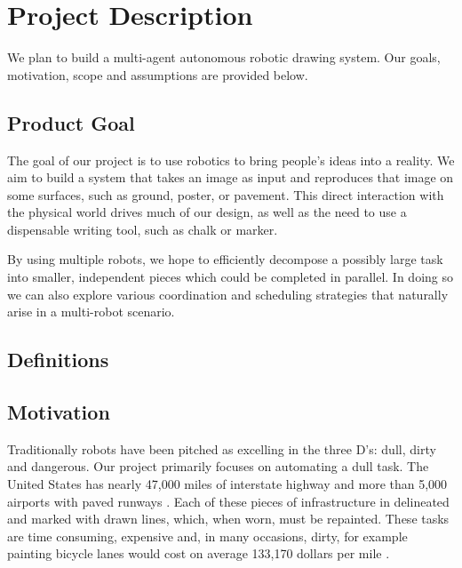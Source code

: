 
\section{Project Description}
\label{sec:project_description}
We plan to build a multi-agent autonomous robotic drawing system. Our goals, motivation,  scope and assumptions are provided below.

\subsection{Product Goal}
\label{sec:project_goal}
The goal of our project is to use robotics to bring people's ideas  into a reality. 
We aim to build a system that takes an image as input and reproduces that image on some surfaces, such as ground, poster, or pavement.
This direct interaction with the physical world drives much of our design, as well as the need to use a dispensable writing tool, such as chalk or marker. 

By using multiple robots, we hope to efficiently decompose a possibly large task into smaller, independent pieces which could be completed in parallel.
In doing so we can also explore various coordination and scheduling strategies that naturally arise in a multi-robot scenario. 

\subsection{Definitions}
\label{sec:definitions}


\subsection{Motivation}
\label{sec:motivation}

Traditionally robots have been pitched as excelling in the three D's: dull, dirty and dangerous. Our project primarily focuses on automating a dull task. The United States has nearly 47,000 miles of interstate highway and more than 5,000 airports with paved runways \cite{buildfuture}. Each of these pieces of infrastructure in delineated and marked with drawn lines, which, when worn, must be repainted. These tasks are time consuming, expensive and, in many occasions, dirty, for example painting bicycle lanes would cost on average 133,170 dollars per mile \cite{bicyclist}.

